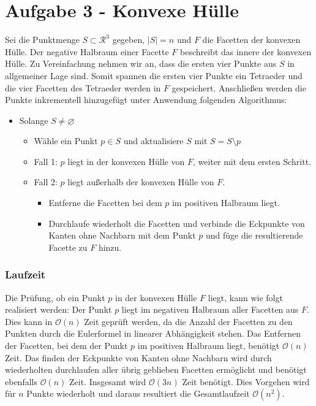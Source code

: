 \documentclass[a4paper]{article}
\begin{document}
\section*{Aufgabe 3 - Konvexe Hülle}

Sei die Punktmenge $S \subset \mathcal{R}^3$ gegeben, $|S| = n$ und $F$ die Facetten der konvexen Hülle. Der negative Halbraum einer Facette $F$ beschreibt das innere der konvexen Hülle. 
Zu Vereinfachung nehmen wir an, dass die ersten vier Punkte aus $S$ in allgemeiner Lage sind. Somit spannen die ersten vier Punkte ein Tetraeder und die vier Facetten des Tetraeder werden in $F$ gespeichert. Anschließen werden die Punkte inkrementell hinzugefügt unter Anwendung folgenden Algorithmus:

\begin{itemize}
	\item Solange $S \neq \varnothing$
	\begin{itemize}	
		\item Wähle ein Punkt $p \in S$ und aktualisiere $S$ mit $S = S \setminus {p}$
		\item Fall 1: $p$ liegt in der konvexen Hülle von $F$, weiter mit dem ersten Schritt.
		\item Fall 2: $p$ liegt außerhalb der konvexen Hülle von $F$.
	\begin{itemize}
		\item Entferne die Facetten bei dem $p$ im positiven Halbraum liegt.
		\item Durchlaufe wiederholt die Facetten und verbinde die Eckpunkte von Kanten ohne Nachbarn mit dem Punkt $p$ und füge die resultierende Facette zu $F$ hinzu.
	\end{itemize}
	\end{itemize}
\end{itemize}


\subsubsection*{Laufzeit}

Die Prüfung, ob ein Punkt $p$ in der konvexen Hülle $F$ liegt, kann wie folgt realisiert werden: Der Punkt $p$ liegt im negativen Halbraum aller Facetten aus $F$. Dies kann in $\mathcal{O}(n)$ Zeit geprüft werden, da die Anzahl der Facetten zu den Punkten durch die Eulerformel in linearer Abhängigkeit stehen. Das Entfernen der Facetten, bei dem der Punkt $p$ im positiven Halbraum liegt, benötigt $\mathcal{O}(n)$ Zeit. Das finden der Eckpunkte von Kanten ohne Nachbarn wird durch wiederholten durchlaufen aller übrig geblieben Facetten ermöglicht und benötigt ebenfalls $\mathcal{O}(n)$ Zeit. Insgesamt wird $\mathcal{O}(3n)$ Zeit benötigt. Dies Vorgehen wird für $n$ Punkte wiederholt und daraus resultiert die Gesamtlaufzeit $\mathcal{O}(n^2)$.
\end{document}
